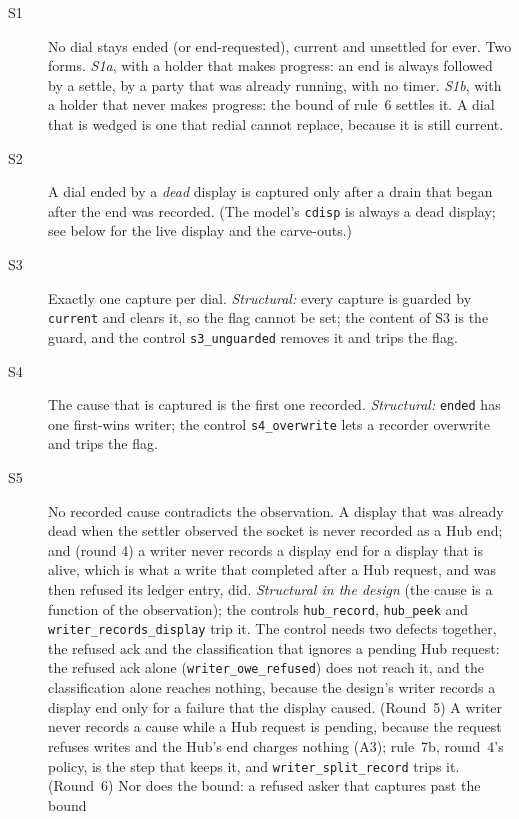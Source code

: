 \documentclass[a4paper,10pt,fleqn]{article}
\begin{document}
\begin{description}
  \item[S1] No dial stays ended (or end-requested), current and unsettled for
    ever.  Two forms.  \emph{S1a}, with a holder that makes progress: an end is
    always followed by a settle, by a party that was already running, with no
    timer.  \emph{S1b}, with a holder that never makes progress: the bound of
    rule~6 settles it.  A dial that is wedged is one that redial cannot replace,
    because it is still current.
  \item[S2] A dial ended by a \emph{dead} display is captured only after a drain
    that began after the end was recorded.  (The model's \texttt{cdisp} is
    always a dead display; see below for the live display and the carve-outs.)
  \item[S3] Exactly one capture per dial.  \emph{Structural:} every capture is
    guarded by \texttt{current} and clears it, so the flag cannot be set; the
    content of S3 is the guard, and the control \texttt{s3\_unguarded} removes it
    and trips the flag.
  \item[S4] The cause that is captured is the first one recorded.
    \emph{Structural:} \texttt{ended} has one first-wins writer; the control
    \texttt{s4\_overwrite} lets a recorder overwrite and trips the flag.
  \item[S5] No recorded cause contradicts the observation.  A display that was
    already dead when the settler observed the socket is never recorded as a Hub
    end; and (round 4) a writer never records a display end for a display that is
    alive, which is what a write that completed after a Hub request, and was
    then refused its ledger entry, did.  \emph{Structural in the design} (the
    cause is a function of the observation); the controls \texttt{hub\_record},
    \texttt{hub\_peek} and \texttt{writer\_records\_display} trip it.  The
    control needs two defects together, the refused ack and the classification
    that ignores a pending Hub request: the refused ack alone
    (\texttt{writer\_owe\_refused}) does not reach it, and the classification
    alone reaches nothing, because the design's writer records a display end
    only for a failure that the display caused.  (Round~5) A writer never
    records a cause while a Hub request is pending, because the request refuses
    writes and the Hub's end charges nothing (A3); rule~7b, round~4's policy, is
    the step that keeps it, and \texttt{writer\_split\_record} trips it.
    (Round~6) Nor does the bound: a refused asker that captures past the bound

\end{description}
\end{document}
